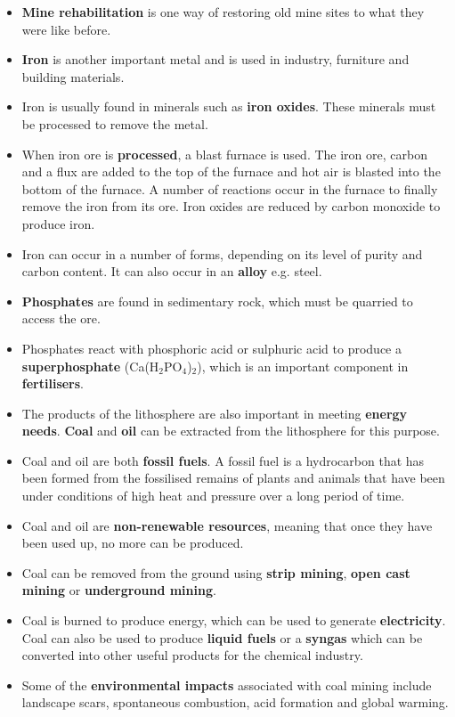 \begin{itemize}
\item{\textbf{Mine rehabilitation} is one way of restoring old mine sites to what they were like before.}
\item{\textbf{Iron} is another important metal and is used in industry, furniture and building materials.}
\item{Iron is usually found in minerals such as \textbf{iron oxides}. These minerals must be processed to remove the metal.}
\item{When iron ore is \textbf{processed}, a blast furnace is used. The iron ore, carbon and a flux are added to the top of the furnace and hot air is blasted into the bottom of the furnace. A number of reactions occur in the furnace to finally remove the iron from its ore. Iron oxides are reduced by carbon monoxide to produce iron.}
\item{Iron can occur in a number of forms, depending on its level of purity and carbon content. It can also occur in an \textbf{alloy} e.g. steel.}
\item{\textbf{Phosphates} are found in sedimentary rock, which must be quarried to access the ore.}
\item{Phosphates react with phosphoric acid or sulphuric acid to produce a \textbf{superphosphate} (Ca(H$_{2}$PO$_{4}$)$_{2}$), which is an important component in \textbf{fertilisers}.}
\item{The products of the lithosphere are also important in meeting \textbf{energy needs}. \textbf{Coal} and \textbf{oil} can be extracted from the lithosphere for this purpose.}
\item{Coal and oil are both \textbf{fossil fuels}. A fossil fuel is a hydrocarbon that has been formed from the fossilised remains of plants and animals that have been under conditions of high heat and pressure over a long period of time.}
\item{Coal and oil are \textbf{non-renewable resources}, meaning that once they have been used up, no more can be produced.}
\item{Coal can be removed from the ground using \textbf{strip mining}, \textbf{open cast mining} or \textbf{underground mining}. }
\item{Coal is burned to produce energy, which can be used to generate \textbf{electricity}. Coal can also be used to produce \textbf{liquid fuels} or a \textbf{syngas} which can be converted into other useful products for the chemical industry.}
\item{Some of the \textbf{environmental impacts} associated with coal mining include landscape scars, spontaneous combustion, acid formation and global warming.}

\end{itemize}
